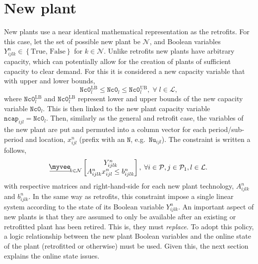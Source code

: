 \documentclass{amsart}
\newcommand{\myveebar}{\mathbin{\vcenter{\hbox{$ \underline{\mkern-2.4mu{\myvee}\mkern-2.4mu} $}}}}
\begin{document}
\section{New plant}
%
New plants use a near identical mathematical representation as the retrofits.
For this case, let the set of possible new plant be $\mathcal{N}$, and Boolean
variables $Y^n_{ijlk} \in \left\{\text{True, False}\right\}$ for $k\in
\mathcal{N}$. Unlike retrofits new plants have arbitrary capacity, which can
potentially allow for the creation of plants of sufficient capacity to clear
demand. For this it is considered a new capacity variable that with upper
and lower bounds,
%
\begin{equation}
    \mathtt{Nc0}^{\text{LB}}_l \leq \mathtt{Nc0}_{l} 
    \leq \mathtt{Nc0}^{\text{UB}}_l, \; \forall \; l \in \mathcal{L},
\end{equation}
%
where $\mathtt{Nc0}^{\text{LB}}_l$ and $\mathtt{Nc0}^{\text{LB}}_l$ represent
lower and upper bounds of the new capacity variable $\mathtt{Nc0}_{l}$. This is
then linked to the new plant capacity variable $\mathtt{ncap}_{ijl} =
\mathtt{Nc0}_{l}$. Then, similarly as the general and retrofit case, the
variables of the new plant are put and permuted into a column vector for each
period/sub-period and location, $x^n_{ijl}$ (prefix with an $\mathtt{N}$,
e.g.\ $\mathtt{Nu}_{ijl}$).
The constraint is written a follows,
%
\begin{equation}
    \myveebar_{k \in \mathcal{N}}
    \begin{bmatrix}
        Y^n_{ijlk} \\
        A^n_{ijlk} x^n_{ijl} \leq b^n_{ijlk}
    \end{bmatrix}
    , \; \forall i\in \mathcal{P}, j\in \mathcal{P}_1, l\in \mathcal{L}.
\end{equation}
%
with respective matrices and right-hand-side for each new plant technology,
$A^n_{ijlk}$ and $b^n_{ijlk}$. In the same way as retrofits, this constraint
impose a single linear system according to the state of its Boolean variable
$Y^n_{ijlk}$.
%
An important aspect of new plants is that they are assumed to only be
available after an existing or retrofitted plant has been retired. This is, they
must \emph{replace}. To adopt this policy, a logic relationship between the new
plant Boolean variables and the online state of the plant (retrofitted or
otherwise) must be used. Given this, the next section explains the online state
issues.
%
\end{document}
